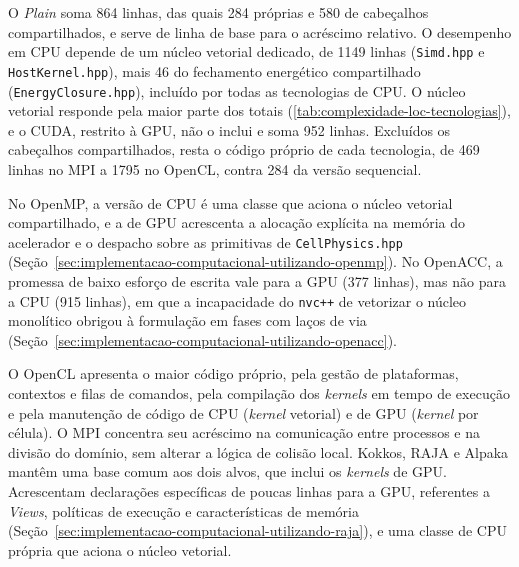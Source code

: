 O \textit{Plain} soma 864 linhas, das quais 284 próprias e 580 de cabeçalhos compartilhados, e serve de linha de base para o acréscimo relativo.
O desempenho em CPU depende de um núcleo vetorial dedicado, de 1149 linhas (\texttt{Simd.hpp} e \texttt{HostKernel.hpp}), mais 46 do fechamento energético compartilhado (\texttt{EnergyClosure.hpp}), incluído por todas as tecnologias de CPU.
O núcleo vetorial responde pela maior parte dos totais (\autoref{tab:complexidade-loc-tecnologias}), e o CUDA, restrito à GPU, não o inclui e soma 952 linhas.
Excluídos os cabeçalhos compartilhados, resta o código próprio de cada tecnologia, de 469 linhas no MPI a 1795 no OpenCL, contra 284 da versão sequencial.

No OpenMP, a versão de CPU é uma classe que aciona o núcleo vetorial compartilhado, e a de GPU acrescenta a alocação explícita na memória do acelerador e o despacho sobre as primitivas de \texttt{CellPhysics.hpp} (Seção~\ref{sec:implementacao-computacional-utilizando-openmp}).
No OpenACC, a promessa de baixo esforço de escrita vale para a GPU (377 linhas), mas não para a CPU (915 linhas), em que a incapacidade do \texttt{nvc++} de vetorizar o núcleo monolítico obrigou à formulação em fases com laços de via (Seção~\ref{sec:implementacao-computacional-utilizando-openacc}).

O OpenCL apresenta o maior código próprio, pela gestão de plataformas, contextos e filas de comandos, pela compilação dos \textit{kernels} em tempo de execução e pela manutenção de código de CPU (\textit{kernel} vetorial) e de GPU (\textit{kernel} por célula).
O MPI concentra seu acréscimo na comunicação entre processos e na divisão do domínio, sem alterar a lógica de colisão local.
Kokkos, RAJA e Alpaka mantêm uma base comum aos dois alvos, que inclui os \textit{kernels} de GPU.
Acrescentam declarações específicas de poucas linhas para a GPU, referentes a \textit{Views}, políticas de execução e características de memória (Seção~\ref{sec:implementacao-computacional-utilizando-raja}), e uma classe de CPU própria que aciona o núcleo vetorial.


